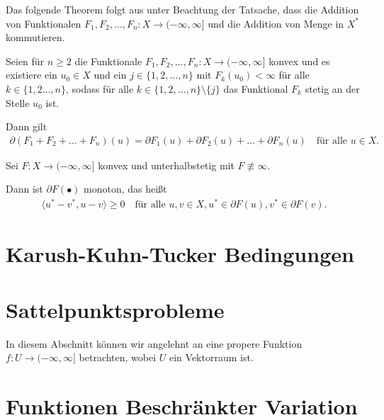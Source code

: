 Das folgende Theorem folgt aus \cite[S. 389, Theorem 47.B]{Zei85} unter 
Beachtung der Tatsache, dass die Addition von Funktionalen 
$F_1,F_2,\ldots,F_n:X\to (-\infty,\infty]$ und die Addition von
Menge in $X^\ast$ kommutieren.

\begin{theorem}
  \label{thm:subdifferentialSumRule}
  Seien für $n\geq 2$ die Funktionale $F_1,F_2,\ldots,F_n: X\to
  (-\infty,\infty]$ konvex und es existiere
  ein $u_0\in X$ und ein $j\in\{1,2,\ldots,n\}$ mit $F_k(u_0)<\infty$
  für alle $k\in\{1,2\ldots,n\}$, 
  sodass für alle $k\in\{1,2,\ldots,n\}\setminus\{j\}$ das Funktional
  $F_k$ stetig an der Stelle $u_0$ ist.

  Dann gilt 
  \begin{align*}
    \partial (F_1+F_2+\ldots+ F_n)(u) 
    = \partial F_1(u)+\partial F_2(u)+ \ldots + \partial F_n(u) \quad\text{für
    alle } u\in X.
  \end{align*}
\end{theorem}

\begin{theorem}
  \label{thm:subdifferentialMonotonicity}
  Sei $F:X\to (-\infty,\infty]$ konvex und unterhalbstetig mit $F\nequiv\infty$.

  Dann ist $\partial F(\bullet)$ monoton, das heißt 
  \begin{align*}
    \langle u^\ast-v^\ast,u-v\rangle\geq 0\quad \text{für alle } u,v\in X, 
    u^\ast \in \partial F(u), v^\ast \in \partial F(v).
  \end{align*}
\end{theorem}

\section{Karush-Kuhn-Tucker Bedingungen}

\section{Sattelpunktsprobleme}
In diesem Abschnitt können wir angelehnt an \cite[S. 4ff., S. 165ff.]{Aub79}
eine propere Funktion $f:U\to (-\infty,\infty]$ betrachten, wobei $U$ ein
Vektorraum ist.


\section{Funktionen Beschränkter Variation}

